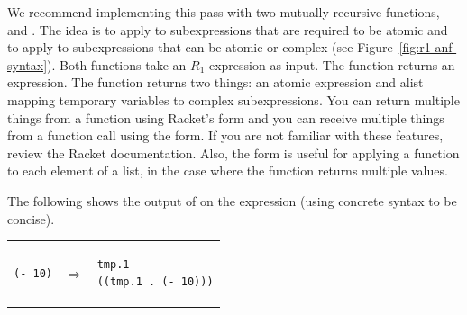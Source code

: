 \documentclass[11pt]{book}
\begin{document}
We recommend implementing this pass with two mutually recursive
functions,  and . The idea is to apply
 to subexpressions that are required to be atomic and
to apply  to subexpressions that can be atomic or
complex (see Figure~\ref{fig:r1-anf-syntax}).  Both functions take an
$R_1$ expression as input.  The  function returns an
expression.  The  function returns two things: an
atomic expression and alist mapping temporary variables to complex
subexpressions. You can return multiple things from a function using
Racket's  form and you can receive multiple things from a
function call using the  form. If you are not
familiar with these features, review the Racket documentation.  Also,
the \href{https://docs.racket-lang.org/reference/for.html#%28form._%28%28lib._racket%2Fprivate%2Fbase..rkt%29._for%2Flists%29%29}{\code{for/lists}}
form is useful for applying a function to each
element of a list, in the case where the function returns multiple
values.

The following shows the output of  on the expression
 (using concrete syntax to be concise).

\begin{tabular}{lll}
\begin{minipage}{0.4\textwidth}
\begin{lstlisting}
(- 10)
\end{lstlisting}
\end{minipage}
&
$\Rightarrow$
&
\begin{minipage}{0.4\textwidth}
\begin{lstlisting}
tmp.1
((tmp.1 . (- 10)))
\end{lstlisting}
\end{minipage}
\end{tabular}
\end{document}

